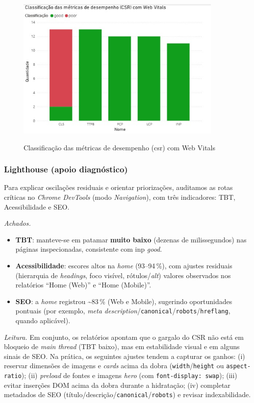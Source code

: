 \begin{figure}[H]
\centering
\caption{Classificação das métricas de desempenho (\acrshort{csr}) com Web Vitals}
\includegraphics[width=0.9\textwidth]{media/metricas_csr_web_vitals.jpeg}
\label{fig:csr-webvitals}
\end{figure}

\subsubsection{Lighthouse (apoio diagnóstico)}
Para explicar oscilações residuais e orientar priorizações, auditamos as rotas críticas no \emph{Chrome DevTools} (modo \emph{Navigation}), com três indicadores: TBT, Acessibilidade e SEO.

\noindent \textit{Achados.}
\begin{itemize}
    \item \textbf{TBT}: manteve-se em patamar \textbf{muito baixo} (dezenas de milissegundos) nas páginas inspecionadas, consistente com \acrshort{inp} \textit{good}.
    \item \textbf{Acessibilidade}: escores altos na \emph{home} (93--94\,\%), com ajustes residuais (hierarquia de \emph{headings}, foco visível, rótulos/\textit{alt}) valores observados nos relatórios “Home (Web)” e “Home (Mobile)”.
    \item \textbf{SEO}: a \emph{home} registrou \textasciitilde{}83\,\% (Web e Mobile), sugerindo oportunidades pontuais (por exemplo, \emph{meta description}/\texttt{canonical}/\texttt{robots}/\texttt{hreflang}, quando aplicável).
\end{itemize}

\noindent \textit{Leitura.} Em conjunto, os relatórios apontam que o gargalo do CSR não está em bloqueio de \emph{main thread} (TBT baixo), mas em estabilidade visual e em alguns sinais de SEO. Na prática, os seguintes ajustes tendem a capturar os ganhos: (i) reservar dimensões de imagens e \emph{cards} acima da dobra (\texttt{width}/\texttt{height} ou \texttt{aspect-ratio}); (ii) \emph{preload} de fontes e imagens \emph{hero} (com \texttt{font-display: swap}); (iii) evitar inserções DOM acima da dobra durante a hidratação; (iv) completar metadados de SEO (título/descrição/\texttt{canonical}/\texttt{robots}) e revisar indexabilidade.


